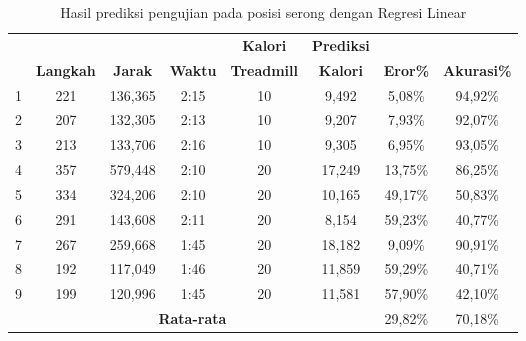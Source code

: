 \begin{longtable}{|c|c|c|c|c|c|c|c|}
  \caption{Hasil prediksi pengujian pada posisi serong dengan Regresi Linear}
  \label{tb:PengujianPosisiSerongAnalisaPrediksiRegresi}                                   \\
  \hline
  \rowcolor[HTML]{C0C0C0}
  & & & & \textbf{Kalori} & \textbf{Prediksi} & & \\
  \rowcolor[HTML]{C0C0C0}
  \multirow{-2}{*}{\textbf{Percobaan}} & \multirow{-2}{*}{\textbf{Langkah}} & \multirow{-2}{*}{\textbf{Jarak}} & \multirow{-2}{*}{\textbf{Waktu}} & \textbf{Treadmill} & \textbf{Kalori} & \multirow{-2}{*}{\textbf{Eror\%}} & \multirow{-2}{*}{\textbf{Akurasi\%}} \\
  
  \hline
  1   & 221   & 136,365    & 2:15    & 10    & 9,492    & 5,08\%      & 94,92\%   \\
  \hline  
  2   & 207   & 132,305    & 2:13    & 10    & 9,207    & 7,93\%      & 92,07\%  \\
  \hline
  3   & 213   & 133,706    & 2:16    & 10    & 9,305    & 6,95\%      & 93,05\%   \\
  \hline
  4   & 357   & 579,448    & 2:10    & 20    & 17,249   & 13,75\%     & 86,25\%  \\
  \hline
  5   & 334   & 324,206    & 2:10    & 20    & 10,165   & 49,17\%     & 50,83\%    \\
  \hline
  6   & 291   & 143,608    & 2:11    & 20    & 8,154    & 59,23\%     & 40,77\%   \\
  \hline
  7   & 267   & 259,668    & 1:45    & 20    & 18,182   & 9,09\%      & 90,91\%   \\
  \hline
  8   & 192   & 117,049    & 1:46    & 20    & 11,859   & 59,29\%     & 40,71\%   \\
  \hline
  9   & 199   & 120,996    & 1:45    & 20    & 11,581   & 57,90\%     & 42,10\%   \\
  \hline

  \multicolumn{6}{|c|}{\textbf{Rata-rata}} & 29,82\% & 70,18\%  \\
  \hline
\end{longtable}

